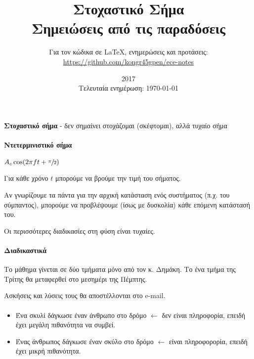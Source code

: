 \documentclass[11pt,a4paper,notitlepage,fleqn,draft]{article}
\title{Στοχαστικό Σήμα
	\\
	{
	\normalsize Σημειώσεις από τις παραδόσεις
	}}
\date{2017
	\\
	{
	\small Τελευταία ενημέρωση: \today
	}
	}
\author{
	Για τον κώδικα σε \LaTeX, ενημερώσεις και προτάσεις:
\\
 \url{https://github.com/kongr45gpen/ece-notes}}
\begin{document}
	\maketitle

	\tableofcontents

	\newpage
    
    \textbf{Στοχαστικό σήμα} - δεν σημαίνει στοχάζομαι
    (σκέφτομαι), αλλά
    τυχαίο σήμα
    
    \paragraph{Ντετερμινιστικό σήμα}
    \( A_c\cos(2\pi f t + \sfrac{\pi}{2}) \)
    
    
    Για κάθε χρόνο \(t\) μπορούμε να βρούμε την τιμή του
    σήματος.
    
    Αν γνωρίζουμε τα πάντα για
    την αρχική κατάσταση ενός συστήματος
    (π.χ. του σύμπαντος), μπορούμε να προβλέψουμε
    (ίσως με δυσκολία) κάθε επόμενη κατάστασή του.
    
    Οι περισσότερες διαδικασίες στη φύση είναι τυχαίες.
    
    \paragraph{Διαδικαστικά}
    Το μάθημα γίνεται σε δύο τμήματα μόνο από τον κ. Δημάκη. Το
    ένα τμήμα της Τρίτης θα μεταφερθεί στο μεσημέρι της Πέμπτης.
    
    Ασκήσεις και λύσεις τους θα αποστέλλονται στο e-mail.
    
    \paragraph{}
    \begin{itemize}
    	\item Ένα σκυλί δάγκωσε έναν άνθρωπο στο δρόμο
    	\( \leftarrow \) δεν είναι πληροφορία, επειδή έχει
    	μεγάλη πιθανότητα να συμβεί.
    	\item Ένας άνθρωπος δάγκωσε έναν σκύλο στο δρόμο
    	\( \leftarrow \) είναι πληροφορορία, επειδή έχει μικρή
    	πιθανότητα.
    \end{itemize}
    
\end{document}
